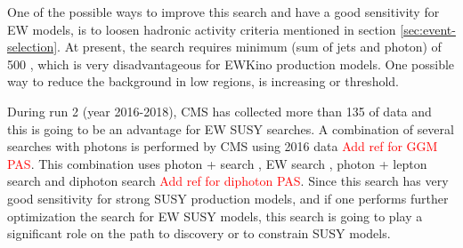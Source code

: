 One of the possible ways to improve this search and have a good sensitivity for EW models, is to loosen hadronic activity criteria 
mentioned in section \ref{sec:event-selection}. At present, the search requires minimum \ST (sum \pt of jets and photon) of 500 \gev,
which is very disadvantageous for EWKino production models. One possible way to reduce the background in low \ST regions, is increasing
\ptg or \ptmiss threshold.

During run 2 (year 2016-2018), CMS has collected more than 135 \fbinv of data and this is going to be an advantage for EW SUSY
searches. A combination of several searches with photons is performed by CMS using 2016 data \textcolor{red}{Add ref for GGM PAS}.
This combination uses photon + \ST search \cite{Sirunyan:2017yse}, EW search \cite{Sirunyan:2017nyt}, photon + lepton search
\cite{Sirunyan:2018psa} and diphoton search \textcolor{red}{Add ref for diphoton PAS}. Since this search has very good sensitivity 
for strong SUSY production models, and if one performs further optimization the search for EW SUSY models, this search is going to play
a significant role on the path to discovery or to constrain SUSY models.
